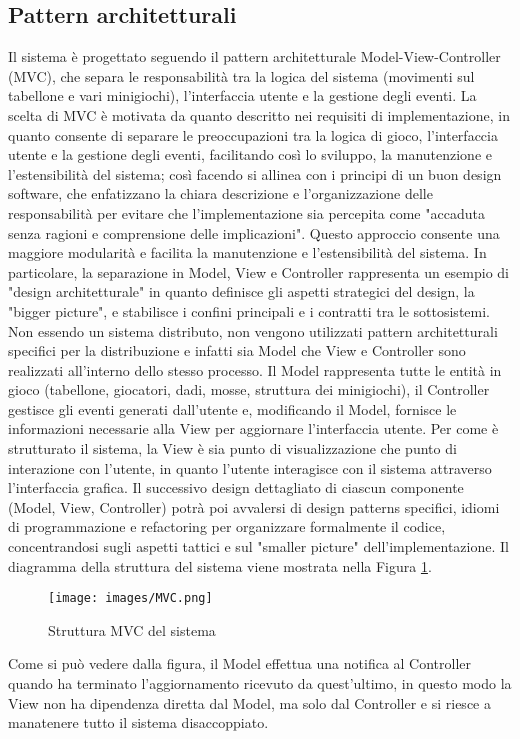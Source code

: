 \subsection{Pattern architetturali} \label{subsec:architectural_patterns}
Il sistema è progettato seguendo il pattern architetturale Model-View-Controller (MVC), che separa le responsabilità tra la
logica del sistema (movimenti sul tabellone e vari minigiochi), l'interfaccia utente e la gestione degli eventi.
La scelta di MVC è motivata da quanto descritto nei requisiti di implementazione, in quanto consente di separare
le preoccupazioni tra la logica di gioco, l'interfaccia utente e la gestione degli eventi, facilitando così lo sviluppo,
la manutenzione e l'estensibilità del sistema; così facendo si allinea con i principi di un buon design software, che enfatizzano
la chiara descrizione e l'organizzazione delle responsabilità per evitare che l'implementazione sia percepita come
"accaduta senza ragioni e comprensione delle implicazioni".
Questo approccio consente una maggiore modularità e facilita la manutenzione e l'estensibilità del sistema. In particolare, la
separazione in Model, View e Controller rappresenta un esempio di "design architetturale" in quanto definisce gli aspetti strategici 
del design, la "bigger picture", e stabilisce i confini principali e i contratti tra le sottosistemi.
Non essendo un sistema distributo, non vengono utilizzati pattern architetturali specifici per la distribuzione e infatti sia
Model che View e Controller sono realizzati all'interno dello stesso processo.
Il Model rappresenta tutte le entità in gioco (tabellone, giocatori, dadi, mosse, struttura dei minigiochi), il Controller gestisce
gli eventi generati dall'utente e, modificando il Model, fornisce le informazioni necessarie alla View per aggiornare l'interfaccia
utente. Per come è strutturato il sistema, la View è sia punto di visualizzazione che punto di interazione con l'utente, in quanto
l'utente interagisce con il sistema attraverso l'interfaccia grafica. Il successivo design dettagliato di ciascun componente
(Model, View, Controller) potrà poi avvalersi di design patterns specifici, idiomi di programmazione e refactoring per organizzare
formalmente il codice, concentrandosi sugli aspetti tattici e sul "smaller picture" dell'implementazione.
Il diagramma della struttura del sistema viene mostrata nella Figura \ref{fig:architectural-patterns}.
\begin{figure}[H]
    \centering
    \texttt{[image: images/MVC.png]}
    \caption{Struttura MVC del sistema}
    \label{fig:architectural-patterns}
\end{figure}
Come si può vedere dalla figura, il Model effettua una notifica al Controller quando ha terminato l'aggiornamento ricevuto da
quest'ultimo, in questo modo la View non ha dipendenza diretta dal Model, ma solo dal Controller e si riesce a manatenere tutto
il sistema disaccoppiato.
